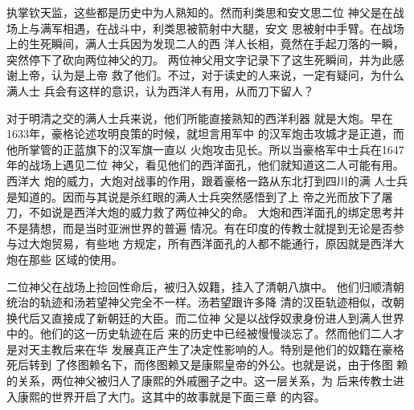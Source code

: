执掌钦天监，这些都是历史中为人熟知的。然而利类思和安文思二位%
神父是在战场上与满军相遇，在战斗中，利类思被箭射中大腿，安文%
思被射中手臂。在战场上的生死瞬间，满人士兵因为发现二人的西%
洋人长相，竟然在手起刀落的一瞬，突然停下了砍向两位神父的刀。%
两位神父用文字记录下了这生死瞬间，并为此感谢上帝，认为是上帝%
救了他们。不过，对于读史的人来说，一定有疑问，为什么满人士%
兵会有这样的意识，认为西洋人有用，从而刀下留人？%
\par
对于明清之交的满人士兵来说，他们所能直接熟知的西洋利器%
就是大炮。早在1633年，豪格论述攻明良策的时候，就坦言用军中%
的汉军炮击攻城才是正道，而他所掌管的正蓝旗下的汉军旗一直以%
火炮攻击见长。所以当豪格军中士兵在1647年的战场上遇见二位%
神父，看见他们的西洋面孔，他们就知道这二人可能有用。西洋大%
炮的威力，大炮对战事的作用，跟着豪格一路从东北打到四川的满%
人士兵是知道的。因而与其说是杀红眼的满人士兵突然感悟到了上%
帝之光而放下了屠刀，不如说是西洋大炮的威力救了两位神父的命。%
大炮和西洋面孔的绑定思考并不是猜想，而是当时亚洲世界的普遍%
情况。有在印度的传教士就提到无论是否参与过大炮贸易，有些地%
方规定，所有西洋面孔的人都不能通行，原因就是西洋大炮在那些%
区域的使用。%
\par
二位神父在战场上捡回性命后，被归入奴籍，挂入了清朝八旗中。%
他们归顺清朝统治的轨迹和汤若望神父完全不一样。汤若望跟许多降%
清的汉臣轨迹相似，改朝换代后又直接成了新朝廷的大臣。而二位神%
父是以战俘奴隶身份进人到满人世界中的。他们的这一历史轨迹在后%
来的历史中已经被慢慢淡忘了。然而他们二人才是对天主教后来在华%
发展真正产生了决定性影响的人。特别是他们的奴籍在豪格死后转到%
了佟图赖名下，而佟图赖又是康熙皇帝的外公。也就是说，由于佟图%
赖的关系，两位神父被归人了康熙的外戚圈子之中。这一层关系，为%
后来传教士进入康熙的世界开启了大门。这其中的故事就是下面三章%
的内容。%
